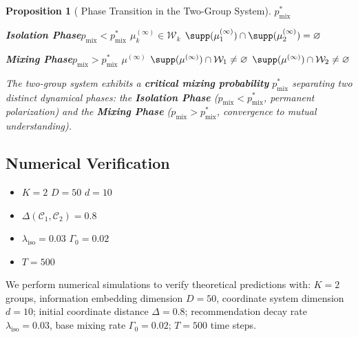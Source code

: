\documentclass[11pt,a4paper]{article}
\newtheorem{proposition}[theorem]{Proposition}
\theoremstyle{remark}
\newcommand{\ISOLambda}{\lambda_{\text{iso}}}
\newcommand{\CoordSys}{\mathcal{C}}
\begin{document}
\begin{proposition}[ Phase Transition in the Two-Group System]
\label{prop:phasetransition}
\textbf{} $p_{\text{mix}}^*$

\medskip
\noindent\textbf{Isolation Phase}$p_{\text{mix}} < p_{\text{mix}}^*$
 $\mu_k^{(\infty)} \in \mathcal{W}_k$
 $\supp(\mu_1^{(\infty)}) \cap \supp(\mu_2^{(\infty)}) = \varnothing$


\medskip
\noindent\textbf{Mixing Phase}$p_{\text{mix}} > p_{\text{mix}}^*$
 $\mu^{(\infty)}$
 $\supp(\mu^{(\infty)}) \cap \mathcal{W}_1 \neq \varnothing$
$\supp(\mu^{(\infty)}) \cap \mathcal{W}_2 \neq \varnothing$


\bigskip
\noindent The two-group system exhibits a \textbf{critical mixing probability}
$p_{\text{mix}}^*$ separating two distinct dynamical phases: the \textbf{Isolation Phase}
($p_{\text{mix}} < p_{\text{mix}}^*$, permanent polarization) and the \textbf{Mixing Phase}
($p_{\text{mix}} > p_{\text{mix}}^*$, convergence to mutual understanding).
\end{proposition}

\subsection{}

\subsection{Numerical Verification}


\begin{itemize}
\item $K=2$  $D=50$ $d=10$
\item  $\Delta(\CoordSys_1, \CoordSys_2) = 0.8$
\item  $\ISOLambda = 0.03$ $\Gamma_0 = 0.02$
\item  $T = 500$
\end{itemize}

We perform numerical simulations to verify theoretical predictions with: $K=2$ groups,
information embedding dimension $D=50$, coordinate system dimension $d=10$; initial
coordinate distance $\Delta = 0.8$; recommendation decay rate $\ISOLambda = 0.03$,
base mixing rate $\Gamma_0 = 0.02$; $T = 500$ time steps.
\end{document}
